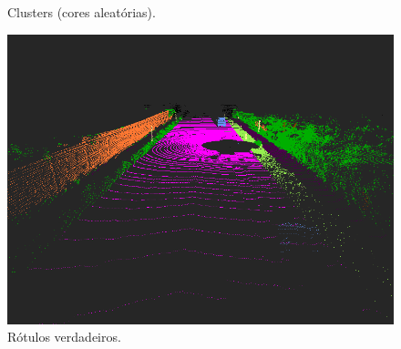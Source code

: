 \documentclass[aspectratio=169,t,xcolor=table]{beamer}
\begin{document}
\begin{frame}
\begin{columns}[T]
\begin{column}{.5\textwidth}
\begin{figure}
                \caption{Clusters (cores aleatórias).}
            \end{figure}
            \begin{figure}
                \includegraphics[width=\textwidth]{figs/label_1_s4f75.png}
                \caption{Rótulos verdadeiros.}
            \end{figure}
        \end{column}
    \end{columns}
\end{frame}
\end{document}
